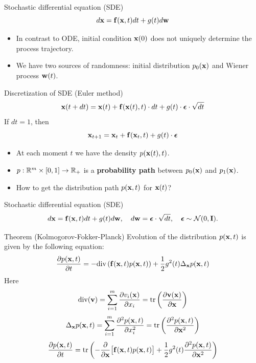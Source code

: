 \begin{frame}{Stochastic differential equation (SDE)}
	\[
		d\mathbf{x} = \mathbf{f}(\mathbf{x}, t) dt + g(t) d \mathbf{w}
	\]
	\vspace{-0.3cm}
	\begin{itemize}
		\item In contrast to ODE, initial condition $\mathbf{x}(0)$ does not uniquely determine the process trajectory.
		\item We have two sources of randomness: initial distribution $p_0(\mathbf{x})$ and Wiener process $\mathbf{w}(t)$.
	\end{itemize}
	\begin{block}{Discretization of SDE (Euler method)}
		\vspace{-0.3cm}
		\[
			\mathbf{x}(t + dt) = \mathbf{x}(t) + \mathbf{f}(\mathbf{x}(t), t) \cdot dt + g(t) \cdot \boldsymbol{\epsilon} \cdot \sqrt{dt}
		\]
		If $dt = 1$, then
		\vspace{-0.3cm}
		\[
			\mathbf{x}_{t + 1} = \mathbf{x}_t + \mathbf{f}(\mathbf{x}_t, t) + g(t) \cdot \boldsymbol{\epsilon}
		\]
		\vspace{-0.7cm}
	\end{block}
	\begin{itemize}
		\item At each moment $t$ we have the density $p(\mathbf{x}(t), t)$.
		\item $p: \mathbb{R}^m \times [0, 1] \rightarrow \mathbb{R}_+$ is a \textbf{probability path} between $p_0(\mathbf{x})$ and $p_1(\mathbf{x})$.
		\item How to get the distribution path $p(\mathbf{x}, t)$ for $\mathbf{x}(t)$?
	\end{itemize}
\end{frame}
\begin{frame}{Stochastic differential equation (SDE)}
	\vspace{-0.4cm}
	\[
		d\mathbf{x} = \mathbf{f}(\mathbf{x}, t) dt + g(t) d \mathbf{w}, \quad d \mathbf{w} = \boldsymbol{\epsilon} \cdot \sqrt{dt}, \quad \boldsymbol{\epsilon} \sim \mathcal{N}(0, \mathbf{I}).
	\]
	\vspace{-0.4cm}
 	\begin{block}{Theorem (Kolmogorov-Fokker-Planck)}
 		Evolution of the distribution $p(\mathbf{x}, t)$ is given by the following equation:
 		\vspace{-0.2cm}
 		\[
 			\frac{\partial p(\mathbf{x}, t)}{\partial t} = - \text{div}\left(\mathbf{f}(\mathbf{x}, t) p(\mathbf{x}, t)\right) + \frac{1}{2}g^2(t) \Delta_{\mathbf{x}}p(\mathbf{x}, t)
 		\]
 		Here
 		\[
 			\text{div} (\mathbf{v}) = \sum_{i=1}^m \frac{\partial v_i(\mathbf{x})}{\partial x_i} = \text{tr}\left( \frac{\partial \mathbf{v}(\mathbf{x})}{\partial \mathbf{x}}  \right)
 		\]
 		\[
 			\Delta_{\mathbf{x}}p(\mathbf{x}, t) = \sum_{i=1}^m \frac{\partial^2 p(\mathbf{x}, t)}{\partial x_i^2} = \text{tr}\left( \frac{\partial^2 p(\mathbf{x}, t)}{\partial \mathbf{x}^2}  \right)
 		\]
 		\[
 			\frac{\partial p(\mathbf{x}, t)}{\partial t} = \text{tr}\left(- \frac{\partial}{\partial \mathbf{x}} \bigl[ \mathbf{f}(\mathbf{x}, t) p(\mathbf{x}, t)\bigr] + \frac{1}{2} g^2(t) \frac{\partial^2 p(\mathbf{x}, t)}{\partial \mathbf{x}^2} \right)
 		\]
 	\end{block}
\end{frame}
